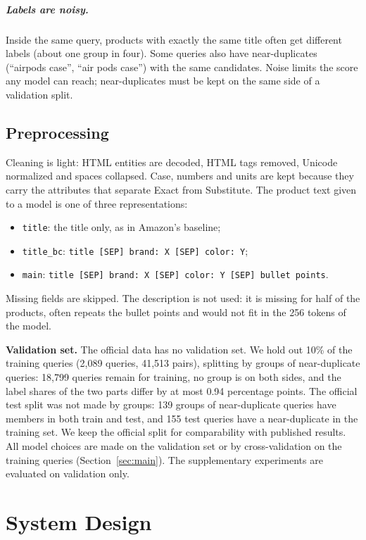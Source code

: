 \documentclass[12pt,a4paper]{report}
\begin{document}
\paragraph{Labels are noisy.} Inside the same query, products with exactly the same title often get different labels (about one group in four). Some queries also have near-duplicates (``airpods case'', ``air pods case'') with the same candidates. Noise limits the score any model can reach; near-duplicates must be kept on the same side of a validation split.

\section{Preprocessing}
Cleaning is light: HTML entities are decoded, HTML tags removed, Unicode normalized and spaces collapsed. Case, numbers and units are kept because they carry the attributes that separate Exact from Substitute. The product text given to a model is one of three representations:
\begin{itemize}
  \item \texttt{title}: the title only, as in Amazon's baseline;
  \item \texttt{title\_bc}: \texttt{title [SEP] brand: X [SEP] color: Y};
  \item \texttt{main}: \texttt{title [SEP] brand: X [SEP] color: Y [SEP] bullet points}.
\end{itemize}
Missing fields are skipped. The description is not used: it is missing for half of the products, often repeats the bullet points and would not fit in the 256 tokens of the model.

\textbf{Validation set.} The official data has no validation set. We hold out 10\% of the training queries (2,089 queries, 41,513 pairs), splitting by groups of near-duplicate queries: 18,799 queries remain for training, no group is on both sides, and the label shares of the two parts differ by at most 0.94 percentage points. The official test split was not made by groups: 139 groups of near-duplicate queries have members in both train and test, and 155 test queries have a near-duplicate in the training set. We keep the official split for comparability with published results. All model choices are made on the validation set or by cross-validation on the training queries (Section~\ref{sec:main}). The supplementary experiments are evaluated on validation only.

\chapter{System Design}\label{ch:method}
\end{document}
